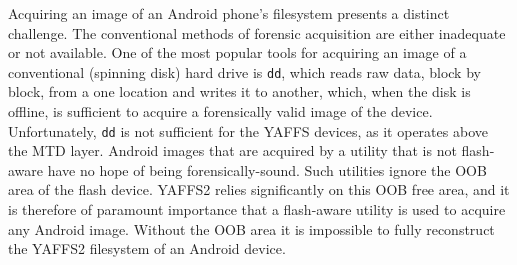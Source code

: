 
Acquiring an image of an Android phone's filesystem presents a distinct challenge.  The conventional methods of forensic acquisition
are either inadequate or not available.  One of the most popular tools for acquiring an image of a conventional (spinning disk) hard
drive is \texttt{dd}, which reads raw data, block by block, from a one location and writes it to another, which, when the disk is
offline, is sufficient to acquire a forensically valid image of the device.  Unfortunately, \texttt{dd} is not sufficient for the
YAFFS devices, as it operates above the MTD layer. Android images that are acquired by a utility that is not flash-aware have no
hope of being forensically-sound. Such utilities ignore the OOB area of the flash device. YAFFS2 relies significantly on
this OOB free area, and it is therefore of paramount importance that a flash-aware utility is used to acquire any Android image.
Without the OOB area it is impossible to fully reconstruct the YAFFS2 filesystem of an Android device.

